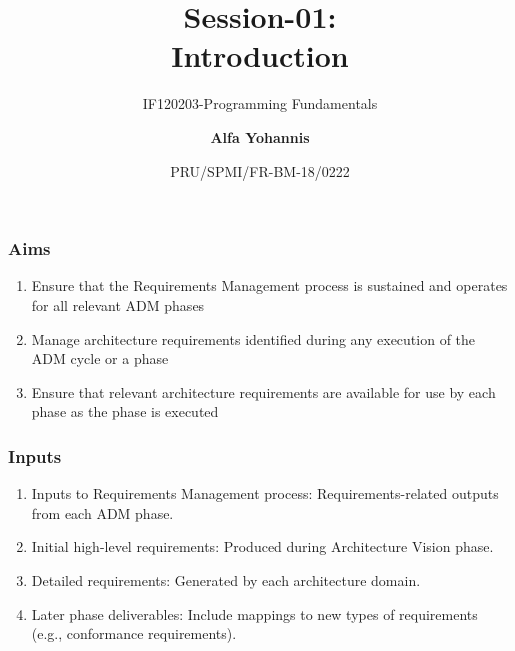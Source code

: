 \documentclass[aspectratio=169, table]{beamer}
\subtitle{IF120203-Programming Fundamentals}
\title{Session-01:\\\LARGE{Introduction}
	\vspace{20pt}}
\date[Serial]{\scriptsize {PRU/SPMI/FR-BM-18/0222}}
\author[Pradita]{\small{\textbf{Alfa Yohannis}}}
\begin{document}
	
	\frame{\titlepage}
	
	

	
	
	\begin{frame}
		\frametitle{Aims}
		\begin{enumerate}
			\item Ensure that the Requirements Management process is sustained and operates for all relevant ADM phases
			\item Manage architecture requirements identified during any execution of the ADM cycle or a phase
			\item Ensure that relevant architecture requirements are available for use by each phase as the phase is executed
		\end{enumerate}
		
	\end{frame}
	
		\begin{frame}
		\frametitle{Inputs}
		\vspace{20pt}
		\begin{enumerate}
			\item Inputs to Requirements Management process: Requirements-related outputs from each ADM phase.
			\item Initial high-level requirements: Produced during Architecture Vision phase.
			\item Detailed requirements: Generated by each architecture domain.
			\item Later phase deliverables: Include mappings to new types of requirements (e.g., conformance requirements).
		\end{enumerate}
	\end{frame}
	
\end{document}
